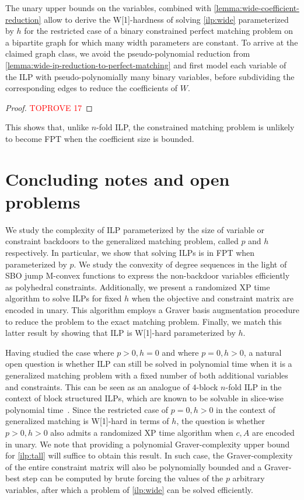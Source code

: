 \documentclass[a4paper,UKenglish,cleveref,thm-restate]{lipics-v2021}
\begin{document}
The unary upper bounds on the variables, combined with \cref{lemma:wide-coefficient-reduction} allow to derive the W[1]-hardness of solving \cref{ilp:wide} parameterized by $h$ for the restricted case of a binary constrained perfect matching problem on a bipartite graph for which many width parameters are constant. To arrive at the claimed graph class, we avoid the pseudo-polynomial reduction from \cref{lemma:wide-ip-reduction-to-perfect-matching} and first model each variable of the ILP with pseudo-polynomially many binary variables, before subdividing the corresponding edges to reduce the coefficients of $W$.

\thmwidewonehard*

\begin{proof}\textcolor{red}{TOPROVE 17}\end{proof}

This shows that, unlike $n$-fold ILP, the constrained matching problem is unlikely to become FPT when the coefficient size is bounded. 
\section{Concluding notes and open problems}
We study the complexity of ILP parameterized by the size of variable or constraint backdoors to the generalized matching problem, called $p$ and $h$ respectively. In particular, we show that solving ILPs is in FPT when parameterized by $p$. We study the convexity of degree sequences in the light of SBO jump M-convex functions to express the non-backdoor variables efficiently as polyhedral constraints. Additionally, we present a randomized XP time algorithm to solve ILPs for fixed $h$ when the objective and constraint matrix are encoded in unary. This algorithm employs a Graver basis augmentation procedure to reduce the problem to the exact matching problem. Finally, we match this latter result by showing that ILP is W[1]-hard parameterized by $h$.

Having studied the case where $p>0,h=0$ and where $p=0,h>0$, a natural open question is whether ILP can still be solved in polynomial time when it is a generalized matching problem with a fixed number of both additional variables and constraints. This can be seen as an analogue of $4$-block $n$-fold ILP in the context of block structured ILPs, which are known to be solvable in slice-wise polynomial time~\cite{DBLP:conf/ipco/HemmeckeKW10}. Since the restricted case of $p=0,h>0$ in the context of generalized matching is W[1]-hard in terms of $h$, the question is whether $p>0,h>0$ also admits a randomized XP time algorithm when $c,A$ are encoded in unary. We note that providing a polynomial Graver-complexity upper bound for \cref{ilp:tall} will suffice to obtain this result. In such case, the Graver-complexity of the entire constraint matrix will also be polynomially bounded and a Graver-best step can be computed by brute forcing the values of the $p$ arbitrary variables, after which a problem of \cref{ilp:wide} can be solved efficiently.
\end{document}
